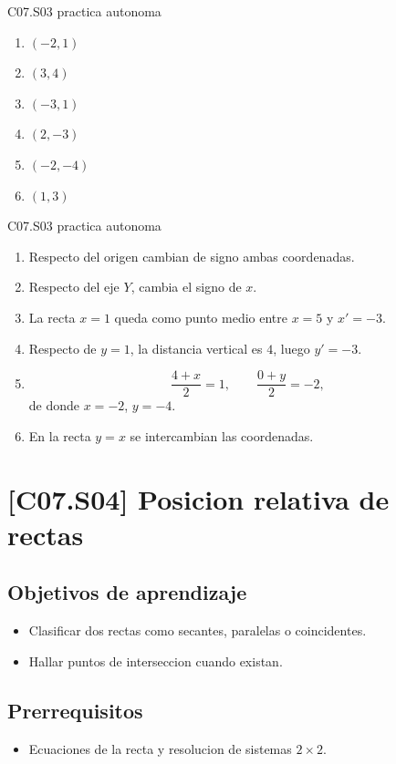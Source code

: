 \begin{shortanswer}{C07.S03 practica autonoma}
\begin{enumerate}[label=\textbf{PX-C07.S03-\arabic*:}, leftmargin=*]
  \item \((-2,1)\)
  \item \((3,4)\)
  \item \((-3,1)\)
  \item \((2,-3)\)
  \item \((-2,-4)\)
  \item \((1,3)\)
\end{enumerate}
\end{shortanswer}

\begin{fullsolution}{C07.S03 practica autonoma}
\begin{enumerate}[label=\textbf{PX-C07.S03-\arabic*:}, leftmargin=*]
  \item Respecto del origen cambian de signo ambas coordenadas.
  \item Respecto del eje \(Y\), cambia el signo de \(x\).
  \item La recta \(x=1\) queda como punto medio entre \(x=5\) y \(x'=-3\).
  \item Respecto de \(y=1\), la distancia vertical es \(4\), luego \(y'=-3\).
  \item
  \[
  \frac{4+x}{2}=1,\qquad \frac{0+y}{2}=-2,
  \]
  de donde \(x=-2\), \(y=-4\).
  \item En la recta \(y=x\) se intercambian las coordenadas.
\end{enumerate}
\end{fullsolution}

\section{[C07.S04] Posicion relativa de rectas}

\subsection*{Objetivos de aprendizaje}
\begin{itemize}
  \item Clasificar dos rectas como secantes, paralelas o coincidentes.
  \item Hallar puntos de interseccion cuando existan.
\end{itemize}

\subsection*{Prerrequisitos}
\begin{itemize}
  \item Ecuaciones de la recta y resolucion de sistemas \(2\times 2\).
\end{itemize}

